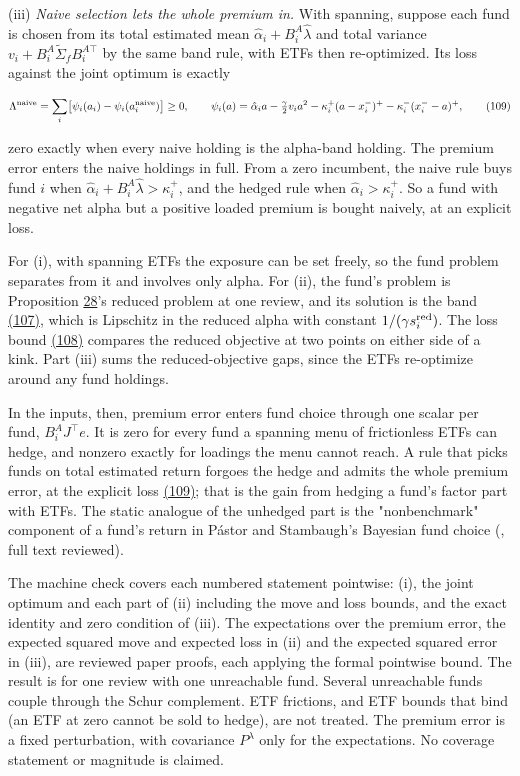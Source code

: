 \documentclass[11pt]{article}
\begin{document}
(iii) \emph{Naive selection lets the whole premium in.} With spanning,
suppose each fund is chosen from its total estimated mean
\(\hat\alpha_i+B^A_i\hat\lambda\) and total variance \(v_i+B^A_i\tilde\Sigma_fB^{A\top}_i\) by the
same band rule, with ETFs then re-optimized. Its loss against the joint
optimum is exactly

\begin{equation*}
\Lambda^{\rm naive}=\sum_i\bigl[\psi_i(a_i)-\psi_i(a^{\rm naive}_i)\bigr]\geq0,\qquad
\psi_i(a)=\hat\alpha_ia-\tfrac\gamma2v_ia^2-\kappa^+_i(a-x^-_i)^+-\kappa^-_i(x^-_i-a)^+,\tag{109}\label{eq:109}
\end{equation*}

zero exactly when every naive holding is the alpha-band holding. The
premium error enters the naive holdings in full. From a zero
incumbent, the naive rule buys fund \(i\) when
\(\hat\alpha_i+B^A_i\hat\lambda>\kappa^+_i\), and the hedged rule when \(\hat\alpha_i>\kappa^+_i\). So a
fund with negative net alpha but a positive loaded premium is bought
naively, at an explicit loss.

For (i), with spanning ETFs the exposure can be set freely, so the
fund problem separates from it and involves only alpha. For (ii), the
fund's problem is Proposition \hyperref[res:Proposition-28]{28}'s reduced problem at one review, and
its solution is the band \hyperref[eq:107]{(107)}, which is Lipschitz in the reduced alpha
with constant \(1/(\gamma s^{\rm red}_i)\). The loss bound \hyperref[eq:108]{(108)} compares the reduced
objective at two points on either side of a kink. Part (iii) sums the
reduced-objective gaps, since the ETFs re-optimize around any fund
holdings.

In the inputs, then, premium error enters fund choice through one
scalar per fund, \(B^A_iJ^\top e\). It is zero for every fund a spanning menu
of frictionless ETFs can hedge, and nonzero exactly for loadings the
menu cannot reach. A rule that picks funds on total estimated return
forgoes the hedge and admits the whole premium error, at the explicit
loss \hyperref[eq:109]{(109)}; that is the gain from hedging a fund's factor part with
ETFs. The static analogue of the unhedged part is the "nonbenchmark"
component of a fund's return in Pástor and Stambaugh's Bayesian fund
choice (\cite{pastor2002investing}, full text reviewed).

The machine check covers each numbered statement pointwise: (i), the
joint optimum and each part of (ii) including the move and loss bounds,
and the exact identity and zero condition of (iii). The expectations
over the premium error, the expected squared move and expected loss in
(ii) and the expected squared error in (iii), are reviewed paper
proofs, each applying the formal pointwise bound. The result is for
one review with one unreachable fund. Several unreachable funds couple
through the Schur complement. ETF frictions, and ETF bounds that bind
(an ETF at zero cannot be sold to hedge), are not treated. The premium
error is a fixed perturbation, with covariance \(P^\lambda\) only for the
expectations. No coverage statement or magnitude is claimed.
\end{document}
